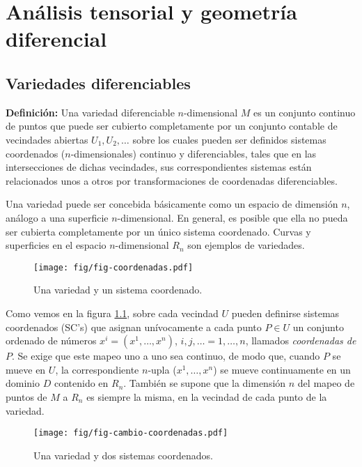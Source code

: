 \chapter{Análisis tensorial y geometría diferencial}\label{cap:tensores}

\section{Variedades diferenciables}

\textbf{Definición:} Una variedad diferenciable $n$-dimensional $M$ es
un conjunto continuo de puntos que puede ser cubierto completamente por un
conjunto contable de vecindades abiertas $U_1, U_2,\dots$ sobre los cuales pueden ser definidos sistemas coordenados ($n$-dimensionales) continuo y diferenciables, tales que en las intersecciones de dichas vecindades, sus correspondientes sistemas están relacionados unos a otros por transformaciones de coordenadas diferenciables.

Una variedad puede ser concebida básicamente como un espacio de
dimensión $n$, análogo a una superficie $n$-dimensional. En general,
es posible que ella no pueda ser cubierta completamente por un único sistema coordenado.
Curvas y superficies en el espacio $n$-dimensional $R_n$ son ejemplos de variedades.
\begin{center}
\begin{figure}[H]
\centerline{\texttt{[image: fig/fig-coordenadas.pdf]}}
\caption{Una variedad y un sistema coordenado.}
\label{1-1}
\end{figure}
\end{center}

Como vemos en la figura \ref{1-1}, sobre cada vecindad $U$ pueden definirse sistemas coordenados (SC's) que asignan unívocamente a cada punto $P\in U$
un conjunto ordenado de números $x^i=(x^1,\dots ,x^n)$,
$i,j,\dots =1,\dots ,n$, llamados \textit{coordenadas de} $P$. Se exige que este mapeo uno a
uno sea continuo, de modo que, cuando $P$ se mueve en $U$, la correspondiente $n$-upla
($x^1,\dots ,x^n$) se mueve continuamente en un dominio $D$ contenido en $R_n$. También se supone que la dimensión $n$ del mapeo de puntos de $M$ a $R_n$ es siempre la misma, en la vecindad de cada punto de la variedad.
\begin{center}
\begin{figure}[H]
\centerline{\texttt{[image: fig/fig-cambio-coordenadas.pdf]}}
\caption{Una variedad y dos sistemas coordenados.}
\label{2-1}
\end{figure}
\end{center}

